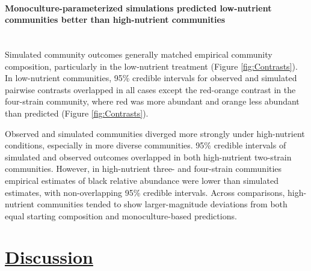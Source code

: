 \paragraph*{Monoculture-parameterized simulations predicted low-nutrient communities better than high-nutrient communities}\mbox{}\\
Simulated community outcomes generally matched empirical community composition, particularly in the low-nutrient treatment (Figure \ref{fig:Contrasts}). In low-nutrient communities, 95\% credible intervals for observed and simulated pairwise contrasts overlapped in all cases except the red-orange contrast in the four-strain community, where red was more abundant and orange less abundant than predicted (Figure \ref{fig:Contrasts}).

Observed and simulated communities diverged more strongly under high-nutrient conditions, especially in more diverse communities. 95\% credible intervals of simulated and observed outcomes overlapped in both high-nutrient two-strain communities. However, in high-nutrient three- and four-strain communities empirical estimates of black relative abundance were lower than simulated estimates, with non-overlapping 95\% credible intervals. Across comparisons, high-nutrient communities tended to show larger-magnitude deviations from both equal starting composition and monoculture-based predictions. 



\section*{\textbf{\underline{Discussion}}}
